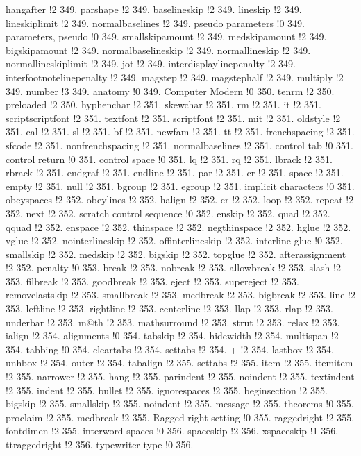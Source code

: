 hangafter !2 349.
parshape !2 349.
baselineskip !2 349.
lineskip !2 349.
lineskiplimit !2 349.
normalbaselines !2 349.
pseudo parameters !0 349.
parameters, pseudo !0 349.
smallskipamount !2 349.
medskipamount !2 349.
bigskipamount !2 349.
normalbaselineskip !2 349.
normallineskip !2 349.
normallineskiplimit !2 349.
jot !2 349.
interdisplaylinepenalty !2 349.
interfootnotelinepenalty !2 349.
magstep !2 349.
magstephalf !2 349.
multiply !2 349.
number !3 349.
anatomy !0 349.
Computer Modern !0 350.
tenrm !2 350.
preloaded !2 350.
hyphenchar !2 351.
skewchar !2 351.
rm !2 351.
it !2 351.
scriptscriptfont !2 351.
textfont !2 351.
scriptfont !2 351.
mit !2 351.
oldstyle !2 351.
cal !2 351.
sl !2 351.
bf !2 351.
newfam !2 351.
tt !2 351.
frenchspacing !2 351.
sfcode !2 351.
nonfrenchspacing !2 351.
normalbaselines !2 351.
control tab !0 351.
control return !0 351.
control space !0 351.
lq !2 351.
rq !2 351.
lbrack !2 351.
rbrack !2 351.
endgraf !2 351.
endline !2 351.
par !2 351.
cr !2 351.
space !2 351.
empty !2 351.
null !2 351.
bgroup !2 351.
egroup !2 351.
implicit characters !0 351.
obeyspaces !2 352.
obeylines !2 352.
halign !2 352.
cr !2 352.
loop !2 352.
repeat !2 352.
next !2 352.
scratch control sequence !0 352.
enskip !2 352.
quad !2 352.
qquad !2 352.
enspace !2 352.
thinspace !2 352.
negthinspace !2 352.
hglue !2 352.
vglue !2 352.
nointerlineskip !2 352.
offinterlineskip !2 352.
interline glue !0 352.
smallskip !2 352.
medskip !2 352.
bigskip !2 352.
topglue !2 352.
afterassignment !2 352.
penalty !0 353.
break !2 353.
nobreak !2 353.
allowbreak !2 353.
slash !2 353.
filbreak !2 353.
goodbreak !2 353.
eject !2 353.
supereject !2 353.
removelastskip !2 353.
smallbreak !2 353.
medbreak !2 353.
bigbreak !2 353.
line !2 353.
leftline !2 353.
rightline !2 353.
centerline !2 353.
llap !2 353.
rlap !2 353.
underbar !2 353.
m@th !2 353.
mathsurround !2 353.
strut !2 353.
relax !2 353.
ialign !2 354.
alignments !0 354.
tabskip !2 354.
hidewidth !2 354.
multispan !2 354.
tabbing !0 354.
cleartabs !2 354.
settabs !2 354.
+ !2 354.
lastbox !2 354.
unhbox !2 354.
outer !2 354.
tabalign !2 355.
settabs !2 355.
item !2 355.
itemitem !2 355.
narrower !2 355.
hang !2 355.
parindent !2 355.
noindent !2 355.
textindent !2 355.
indent !2 355.
bullet !2 355.
ignorespaces !2 355.
beginsection !2 355.
bigskip !2 355.
smallskip !2 355.
noindent !2 355.
message !2 355.
theorems !0 355.
proclaim !2 355.
medbreak !2 355.
Ragged-right setting !0 355.
raggedright !2 355.
fontdimen !2 355.
interword spaces !0 356.
spaceskip !2 356.
xspaceskip !1 356.
ttraggedright !2 356.
typewriter type !0 356.
